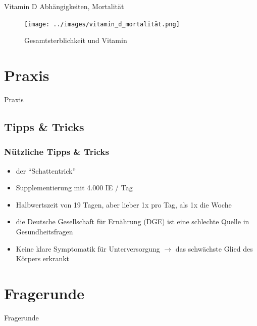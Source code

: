 \documentclass[xcolor=dvipsnames]{beamer}
\begin{document}
\begin{frame}[allowframebreaks]
        \framebreak

        \begin{block}{Vitamin D Abhängigkeiten, Mortalität}
            \begin{figure}
                \texttt{[image: ../images/vitamin\_d\_mortalität.png]}
                \caption{Gesamtsterblichkeit und Vitamin $$}
            \end{figure}
        \end{block}
    \end{frame}

    \section{Praxis}
    {
        \begin{frame}
            \begin{center}
                \Huge Praxis
            \end{center}
        \end{frame}
    }

    \subsection{Tipps \& Tricks}
    \begin{frame}
        \frametitle{Nützliche Tipps \& Tricks}
        \begin{itemize}
            \item der "`Schattentrick"'
            \item Supplementierung mit 4.000 IE / Tag
            \item Halbwertszeit von 19 Tagen, aber lieber 1x pro Tag, als 1x die Woche
            \item die Deutsche Gesellschaft für Ernährung (DGE) ist eine schlechte Quelle in Gesundheitsfragen
            \item Keine klare Symptomatik für Unterversorgung $\rightarrow$ das schwächste Glied des Körpers erkrankt
        \end{itemize}
    \end{frame}

    \section{Fragerunde}
    {
        \begin{frame}
            \begin{center}
                \Huge Fragerunde
            \end{center}
        \end{frame}
    }
\end{document}
